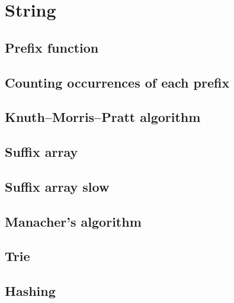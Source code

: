 \section{String}

\subsection{Prefix function}

\subsection{Counting occurrences of each prefix}

\subsection{Knuth–Morris–Pratt algorithm}

\subsection{Suffix array}

\subsection{Suffix array slow}

\subsection{Manacher's algorithm}

\subsection{Trie}

\subsection{Hashing}
